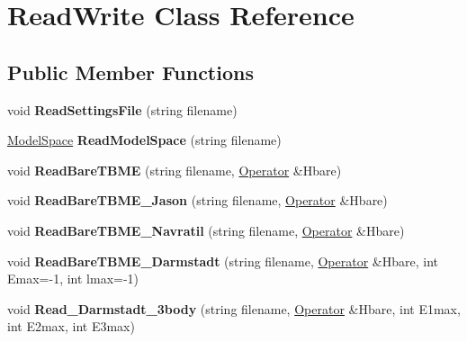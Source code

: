 \hypertarget{classReadWrite}{\section{Read\-Write Class Reference}
\label{classReadWrite}
}
\subsection*{Public Member Functions}
\begin{DoxyCompactItemize}
\item 
\hypertarget{classReadWrite_a7074f8c5e6b1bbeb90a4c534b913ac53}{void {\bfseries Read\-Settings\-File} (string filename)}\label{classReadWrite_a7074f8c5e6b1bbeb90a4c534b913ac53}

\item 
\hypertarget{classReadWrite_adbf1ad5fe47c97c87994cfc28df5c740}{\hyperlink{classModelSpace}{Model\-Space} {\bfseries Read\-Model\-Space} (string filename)}\label{classReadWrite_adbf1ad5fe47c97c87994cfc28df5c740}

\item 
\hypertarget{classReadWrite_a7ebe7ea4d8a322b23b144658da562277}{void {\bfseries Read\-Bare\-T\-B\-M\-E} (string filename, \hyperlink{classOperator}{Operator} \&Hbare)}\label{classReadWrite_a7ebe7ea4d8a322b23b144658da562277}

\item 
\hypertarget{classReadWrite_ae5271000cceab5fcebab7e9d2faf9f1f}{void {\bfseries Read\-Bare\-T\-B\-M\-E\-\_\-\-Jason} (string filename, \hyperlink{classOperator}{Operator} \&Hbare)}\label{classReadWrite_ae5271000cceab5fcebab7e9d2faf9f1f}

\item 
\hypertarget{classReadWrite_ab66f5d7e2e352e973597915c08cad45d}{void {\bfseries Read\-Bare\-T\-B\-M\-E\-\_\-\-Navratil} (string filename, \hyperlink{classOperator}{Operator} \&Hbare)}\label{classReadWrite_ab66f5d7e2e352e973597915c08cad45d}

\item 
\hypertarget{classReadWrite_a855b459639cc52098466cbe22e6becec}{void {\bfseries Read\-Bare\-T\-B\-M\-E\-\_\-\-Darmstadt} (string filename, \hyperlink{classOperator}{Operator} \&Hbare, int Emax=-\/1, int lmax=-\/1)}\label{classReadWrite_a855b459639cc52098466cbe22e6becec}

\item 
\hypertarget{classReadWrite_a84c0cbaf2be415eadffb560ea0bb9785}{void {\bfseries Read\-\_\-\-Darmstadt\-\_\-3body} (string filename, \hyperlink{classOperator}{Operator} \&Hbare, int E1max, int E2max, int E3max)}\label{classReadWrite_a84c0cbaf2be415eadffb560ea0bb9785}


\end{DoxyCompactItemize}
